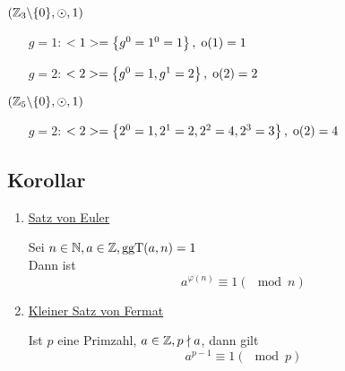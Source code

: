 $(\mathbb{Z}_3 \backslash \{0\}, \odot, 1)$

\begin{itemize}

	\item[$g=1$:]
	$<1> = \left\{g^0 = 1^0 = 1\right\},\; \mathrm{o}(1) = 1$
	
	\item[$g=2$:]
	$<2> = \left\{g^0 = 1, g^1 = 2\right\},\; \mathrm{o}(2)=2$

\end{itemize}

$(\mathbb{Z}_5 \backslash \{0\}, \odot, 1)$

\begin{itemize}
	\item[$g=2$:]
	$<2> = \left\{2^0 = 1, 2^1 = 2, 2^2 = 4, 2^3 = 3\right\}, \; \mathrm{o}(2)=4$
\end{itemize}

\subsection{Korollar}

{\renewcommand{\labelenumi}{(\roman{enumi})}
\begin{enumerate}
	\item
	\underline{Satz von Euler}
	
	Sei $n\in \mathbb{N}, a \in \mathbb{Z}, \mathrm{ ggT }(a, n) = 1$	
	\\Dann ist \[a^{\varphi(n)} \equiv 1 (\mod n)\]
	
	\item
	\underline{Kleiner Satz von Fermat}
	
	Ist $p$ eine Primzahl, $a \in \mathbb{Z}, p \nmid a$, dann gilt
	\[a^{p-1} \equiv 1 (\mod p)\]
	
\end{enumerate}}